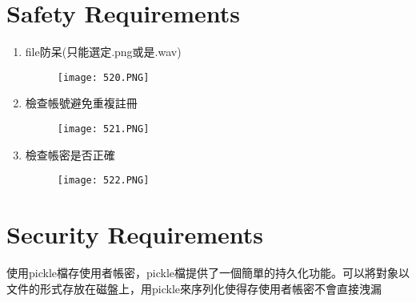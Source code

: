 \documentclass{scrreprt}
\begin{document}
\begin{CJK*}{UTF8}{bsmi}
\section{Safety Requirements}
\begin{enumerate}
\item file防呆(只能選定.png或是.wav)
\begin{figure}[H]
\texttt{[image: 520.PNG]}
\end{figure}
\item 檢查帳號避免重複註冊
\begin{figure}[H]
\texttt{[image: 521.PNG]}
\end{figure}
\item 檢查帳密是否正確
\begin{figure}[H]
\texttt{[image: 522.PNG]}
\end{figure}
\end{enumerate}

\section{Security Requirements}
使用pickle檔存使用者帳密，pickle檔提供了一個簡單的持久化功能。可以將對象以文件的形式存放在磁盤上，用pickle來序列化使得存使用者帳密不會直接洩漏


\end{CJK*}
\end{document}
